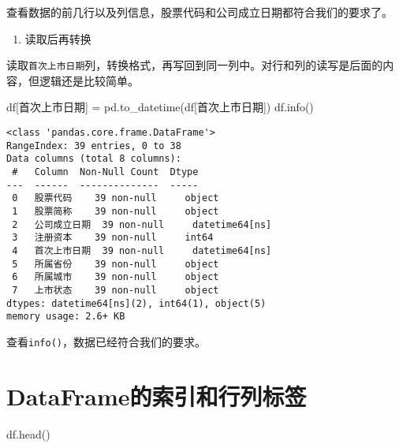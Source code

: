 \documentclass[
  letterpaper,
  DIV=11,
  numbers=noendperiod]{scrreprt}
\newenvironment{Shaded}{\begin{snugshade}}{\end{snugshade}}
\newcommand{\NormalTok}[1]{\textcolor[rgb]{0.00,0.23,0.31}{#1}}
\newcommand{\OperatorTok}[1]{\textcolor[rgb]{0.37,0.37,0.37}{#1}}
\newcommand{\StringTok}[1]{\textcolor[rgb]{0.13,0.47,0.30}{#1}}
\providecommand{\tightlist}{%
  \setlength{\itemsep}{0pt}\setlength{\parskip}{0pt}}\usepackage{longtable,booktabs,array}
\begin{document}
查看数据的前几行以及列信息，股票代码和公司成立日期都符合我们的要求了。

\begin{enumerate}
\def\labelenumi{\arabic{enumi}.}
\setcounter{enumi}{1}
\tightlist
\item
  读取后再转换
\end{enumerate}

读取\texttt{首次上市日期}列，转换格式，再写回到同一列中。对行和列的读写是后面的内容，但逻辑还是比较简单。

\begin{Shaded}
\begin{Highlighting}[]
\NormalTok{df[}\StringTok{\textquotesingle{}首次上市日期\textquotesingle{}}\NormalTok{] }\OperatorTok{=}\NormalTok{ pd.to\_datetime(df[}\StringTok{\textquotesingle{}首次上市日期\textquotesingle{}}\NormalTok{])}
\NormalTok{df.info()}
\end{Highlighting}
\end{Shaded}

\begin{verbatim}
<class 'pandas.core.frame.DataFrame'>
RangeIndex: 39 entries, 0 to 38
Data columns (total 8 columns):
 #   Column  Non-Null Count  Dtype         
---  ------  --------------  -----         
 0   股票代码    39 non-null     object        
 1   股票简称    39 non-null     object        
 2   公司成立日期  39 non-null     datetime64[ns]
 3   注册资本    39 non-null     int64         
 4   首次上市日期  39 non-null     datetime64[ns]
 5   所属省份    39 non-null     object        
 6   所属城市    39 non-null     object        
 7   上市状态    39 non-null     object        
dtypes: datetime64[ns](2), int64(1), object(5)
memory usage: 2.6+ KB
\end{verbatim}

查看\texttt{info()}，数据已经符合我们的要求。

\hypertarget{dataframeux7684ux7d22ux5f15ux548cux884cux5217ux6807ux7b7e}{%
\section{DataFrame的索引和行列标签}\label{dataframeux7684ux7d22ux5f15ux548cux884cux5217ux6807ux7b7e}}

\begin{Shaded}
\begin{Highlighting}[]
\NormalTok{df.head()}
\end{Highlighting}
\end{Shaded}
\end{document}
